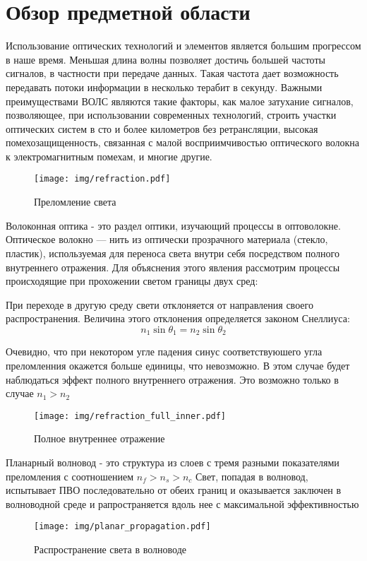 \chapter{Обзор предметной области}
Использование оптических технологий и элементов является большим прогрессом в наше время. Меньшая длина волны позволяет достичь большей частоты сигналов, в частности при передаче данных. Такая частота дает возможность передавать потоки информации в несколько терабит в секунду. Важными преимуществами ВОЛС являются такие факторы, как малое затухание сигналов, позволяющее, при использовании современных технологий, строить участки оптических систем в сто и более километров без ретрансляции, высокая помехозащищенность, связанная с малой восприимчивостью оптического волокна к электромагнитным помехам, и многие другие.

\begin{figure}[h!]
\texttt{[image: img/refraction.pdf]}
\caption{Преломление света}
\end{figure}

Волоконная оптика - это раздел оптики, изучающий процессы в оптоволокне. Оптическое волокно — нить из оптически прозрачного материала (стекло, пластик), используемая для переноса света внутри себя посредством полного внутреннего отражения. Для объяснения этого явления рассмотрим процессы происходящие при прохожении светом границы двух сред:

При переходе в другую среду свети отклоняется от направления своего распространения. Величина этого отклонения определяется законом Снеллиуса:
\begin{equation}
 n_1 \sin\theta_1 = n_2 \sin\theta_2
\end{equation}

Очевидно, что при некотором угле падения синус соответствуюшего угла преломленния окажется больше единицы, что невозможно. В этом случае будет наблюдаться эффект полного внутреннего отражения. Это возможно только в случае $n_1 > n_2$

\begin{figure}[h!]
\texttt{[image: img/refraction\_full\_inner.pdf]}
\caption{Полное внутреннее отражение}
\end{figure}

Планарный волновод - это структура из слоев с тремя разными показателями преломления с соотношением $n_f > n_s > n_c$ Свет, попадая в волновод, испытывает ПВО последовательно от обеих границ и оказывается заключен в волноводной среде и рапространяется вдоль нее с максимальной эффективностью

\begin{figure}[h!]
\texttt{[image: img/planar\_propagation.pdf]}
\caption{Распространение света в волноводе}
\end{figure}
